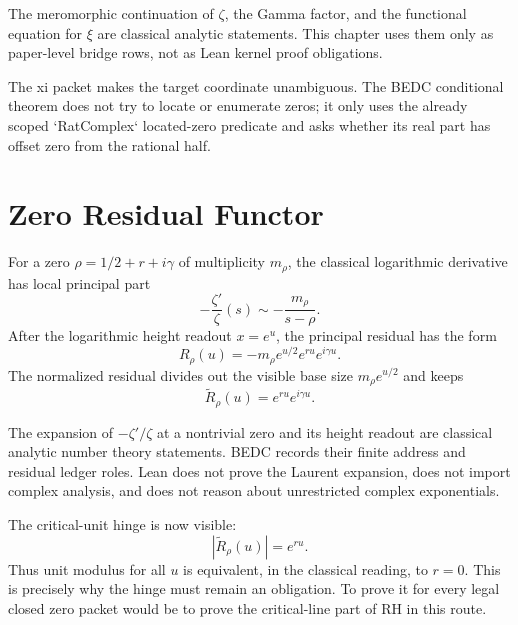 \begin{principle}
\label{prin:rh-zeta-critical-unit-xi-classical}
The meromorphic continuation of $\zeta$, the Gamma factor, and the
functional equation for $\xi$ are classical analytic statements. This
chapter uses them only as paper-level bridge rows, not as Lean kernel
proof obligations.
\end{principle}

The xi packet makes the target coordinate unambiguous. The BEDC
conditional theorem does not try to locate or enumerate zeros; it only
uses the already scoped `RatComplex` located-zero predicate and asks
whether its real part has offset zero from the rational half.

\section{Zero Residual Functor}
\label{sec:rh-zeta-critical-unit-zero-residual-functor}

\begin{definition}
\label{def:rh-zeta-critical-unit-principal-residual}
For a zero $\rho=1/2+r+i\gamma$ of multiplicity $m_{\rho}$, the
classical logarithmic derivative has local principal part
$$
-\frac{\zeta'}{\zeta}(s)
\sim
-\frac{m_{\rho}}{s-\rho}.
$$
After the logarithmic height readout $x=e^u$, the principal residual
has the form
$$
R_{\rho}(u)=-m_{\rho}e^{u/2}e^{ru}e^{i\gamma u}.
$$
The normalized residual divides out the visible base size
$m_{\rho}e^{u/2}$ and keeps
$$
\widetilde R_{\rho}(u)=e^{ru}e^{i\gamma u}.
$$
\end{definition}

\begin{principle}
\label{prin:rh-zeta-critical-unit-log-derivative-classical}
The expansion of $-\zeta'/\zeta$ at a nontrivial zero and its height
readout are classical analytic number theory statements. BEDC records
their finite address and residual ledger roles. Lean does not prove the
Laurent expansion, does not import complex analysis, and does not reason
about unrestricted complex exponentials.
\end{principle}

The critical-unit hinge is now visible:
$$
|\widetilde R_{\rho}(u)|=e^{ru}.
$$
Thus unit modulus for all $u$ is equivalent, in the classical reading,
to $r=0$. This is precisely why the hinge must remain an obligation. To
prove it for every legal closed zero packet would be to prove the
critical-line part of RH in this route.

